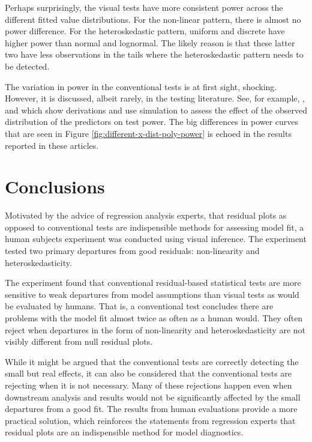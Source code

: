 \documentclass[]{interact}
\theoremstyle{plain}%
\theoremstyle{definition}
\theoremstyle{remark}
\begin{document}
Perhaps surprisingly, the visual tests have more consistent power across
the different fitted value distributions. For the non-linear pattern,
there is almost no power difference. For the heteroskedastic pattern,
uniform and discrete have higher power than normal and lognormal. The
likely reason is that these latter two have less observations in the
tails where the heteroskedastic pattern needs to be detected.

The variation in power in the conventional tests is at first sight,
shocking. However, it is discussed, albeit rarely, in the testing
literature. See, for example, \citet{jamshidian2007study},
\citet{olvera2019relationship} and \citet{zhang2018practical} which show
derivations and use simulation to assess the effect of the observed
distribution of the predictors on test power. The big differences in
power curves that are seen in Figure
\ref{fig:different-x-dist-poly-power} is echoed in the results reported
in these articles.

\hypertarget{conclusions}{%
\section{Conclusions}\label{conclusions}}

Motivated by the advice of regression analysis experts, that residual
plots as opposed to conventional tests are indispensible methods for
assessing model fit, a human subjects experiment was conducted using
visual inference. The experiment tested two primary departures from good
residuals: non-linearity and heteroskedasticity.

The experiment found that conventional residual-based statistical tests
are more sensitive to weak departures from model assumptions than visual
tests as would be evaluated by humans. That is, a conventional test
concludes there are problems with the model fit almost twice as often as
a human would. They often reject when departures in the form of
non-linearity and heteroskedasticity are not visibly different from null
residual plots.

While it might be argued that the conventional tests are correctly
detecting the small but real effects, it can also be considered that the
conventional tests are rejecting when it is not necessary. Many of these
rejections happen even when downstream analysis and results would not be
significantly affected by the small departures from a good fit. The
results from human evaluations provide a more practical solution, which
reinforces the statements from regression experts that residual plots
are an indispensible method for model diagnostics.
\end{document}
